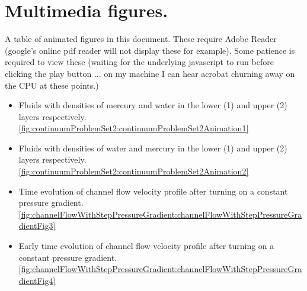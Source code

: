 \chapter{Multimedia figures.}

A table of animated figures in this document.  These require Adobe Reader (google's online pdf reader will not display these for example).  Some patience is required to view these (waiting for the underlying javascript to run before clicking the play button ... on my machine I can hear acrobat churning away on the CPU at these points.)

\begin{itemize}
\item Fluids with densities of mercury and water in the lower (1) and upper (2) layers respectively.  \ref{fig:continuumProblemSet2:continuumProblemSet2Animation1}
\item Fluids with densities of water and mercury in the lower (1) and upper (2) layers respectively.  \ref{fig:continuumProblemSet2:continuumProblemSet2Animation2}
\item Time evolution of channel flow velocity profile after turning on a constant pressure gradient.  \ref{fig:channelFlowWithStepPressureGradient:channelFlowWithStepPressureGradientFig3}
\item Early time evolution of channel flow velocity profile after turning on a constant pressure gradient.  \ref{fig:channelFlowWithStepPressureGradient:channelFlowWithStepPressureGradientFig4}
\end{itemize}

